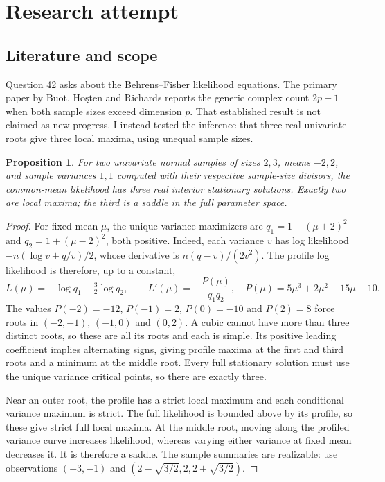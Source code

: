 \documentclass[11pt]{article}
\newtheorem{proposition}{Proposition}
\begin{document}
\section{Research attempt}
\subsection{Literature and scope}
Question 42 asks about the Behrens--Fisher likelihood equations. The primary paper by Buot, Ho\c{s}ten and Richards reports the generic complex count $2p+1$ when both sample sizes exceed dimension $p$. That established result is not claimed as new progress. I instead tested the inference that three real univariate roots give three local maxima, using unequal sample sizes.
\begin{proposition}
For two univariate normal samples of sizes $2,3$, means $-2,2$, and sample variances $1,1$ computed with their respective sample-size divisors, the common-mean likelihood has three real interior stationary solutions. Exactly two are local maxima; the third is a saddle in the full parameter space.
\end{proposition}
\begin{proof}
For fixed mean $\mu$, the unique variance maximizers are $q_1=1+(\mu+2)^2$ and $q_2=1+(\mu-2)^2$, both positive. Indeed, each variance $v$ has log likelihood $-n(\log v+q/v)/2$, whose derivative is $n(q-v)/(2v^2)$. The profile log likelihood is therefore, up to a constant,
\[
L(\mu)=-\log q_1-\tfrac32\log q_2,
\qquad L'(\mu)=-\frac{P(\mu)}{q_1q_2},\quad
P(\mu)=5\mu^3+2\mu^2-15\mu-10.
\]
The values $P(-2)=-12$, $P(-1)=2$, $P(0)=-10$ and $P(2)=8$ force roots in $(-2,-1)$, $(-1,0)$ and $(0,2)$. A cubic cannot have more than three distinct roots, so these are all its roots and each is simple. Its positive leading coefficient implies alternating signs, giving profile maxima at the first and third roots and a minimum at the middle root. Every full stationary solution must use the unique variance critical points, so there are exactly three.

Near an outer root, the profile has a strict local maximum and each conditional variance maximum is strict. The full likelihood is bounded above by its profile, so these give strict full local maxima. At the middle root, moving along the profiled variance curve increases likelihood, whereas varying either variance at fixed mean decreases it. It is therefore a saddle. The sample summaries are realizable: use observations $(-3,-1)$ and $(2-\sqrt{3/2},2,2+\sqrt{3/2})$.
\end{proof}
\end{document}
